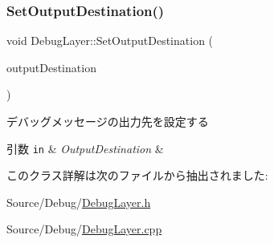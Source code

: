 \mbox{\label{class_debug_layer_a8f3febbe9d2b0a3fcfeb4318516ec534}} 
\subsubsection{\texorpdfstring{Set\+Output\+Destination()}{SetOutputDestination()}}
{\footnotesize\ttfamily void Debug\+Layer\+::\+Set\+Output\+Destination (\begin{DoxyParamCaption}\item[{\mbox{\hyperlink{_debug_layer_8h_a30a5879c4955b5fe9920db6bab79f721}{Output\+Destination}}}]{output\+Destination }\end{DoxyParamCaption})}



デバッグメッセージの出力先を設定する 


\begin{DoxyParams}[1]{引数}
\mbox{\tt in}  & {\em Output\+Destination} & \\
\hline
\end{DoxyParams}


このクラス詳解は次のファイルから抽出されました\+:\begin{DoxyCompactItemize}
\item 
Source/\+Debug/\mbox{\hyperlink{_debug_layer_8h}{Debug\+Layer.\+h}}\item 
Source/\+Debug/\mbox{\hyperlink{_debug_layer_8cpp}{Debug\+Layer.\+cpp}}\end{DoxyCompactItemize}

